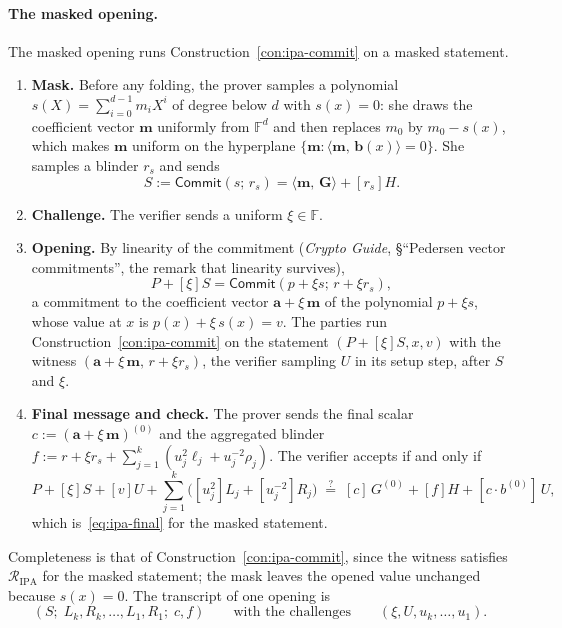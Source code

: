 \documentclass[11pt,a4paper]{article}
\theoremstyle{definition}
\newcommand{\F}{\mathbb{F}}
\newcommand{\ip}[2]{\langle #1,\, #2 \rangle}
\newcommand{\Comm}{\mathsf{Commit}}
\newcommand{\Rel}{\mathcal{R}}
\begin{document}
\paragraph{The masked opening.}
The masked opening runs Construction~\ref{con:ipa-commit} on a masked
statement.
\begin{enumerate}[leftmargin=*, itemsep=2pt]
\item \textbf{Mask.} Before any folding, the prover samples a
  polynomial $s(X) = \sum_{i=0}^{d-1} m_i X^{i}$ of degree below $d$
  with $s(x) = 0$: she draws the coefficient vector $\mathbf m$
  uniformly from $\F^{d}$ and then replaces $m_0$ by $m_0 - s(x)$,
  which makes $\mathbf m$ uniform on the hyperplane
  $\{\mathbf m : \ip{\mathbf m}{\mathbf b(x)} = 0\}$. She samples a
  blinder $r_s$ and sends
  \[
  S := \Comm(s;\, r_s) = \ip{\mathbf m}{\mathbf G} + [r_s]H .
  \]
\item \textbf{Challenge.} The verifier sends a uniform $\xi \in \F$.
\item \textbf{Opening.} By linearity of the commitment (\emph{Crypto
  Guide}, \S``Pedersen vector commitments'', the remark that linearity
  survives),
  \begin{equation}\label{eq:ipa-sym-masked}
  P + [\xi]S = \Comm(p + \xi s;\, r + \xi r_s),
  \end{equation}
  a commitment to the coefficient vector $\mathbf a + \xi\,\mathbf m$ of
  the polynomial $p + \xi s$, whose value at $x$ is
  $p(x) + \xi\,s(x) = v$. The parties run
  Construction~\ref{con:ipa-commit} on the statement
  $(P + [\xi]S, x, v)$ with the witness
  $(\mathbf a + \xi\,\mathbf m,\, r + \xi r_s)$, the verifier sampling
  $U$ in its setup step, after $S$ and $\xi$.
\item \textbf{Final message and check.} The prover sends the final
  scalar $c := (\mathbf a + \xi\,\mathbf m)^{(0)}$ and the aggregated
  blinder $f := r + \xi r_s + \sum_{j=1}^{k}(u_j^{2}\ell_j
  + u_j^{-2}\rho_j)$. The verifier accepts if and only if
  \begin{equation}\label{eq:ipa-masked-final}
  P + [\xi]S + [v]U + \sum_{j=1}^{k}\bigl([u_j^{2}]L_j + [u_j^{-2}]R_j\bigr)
  \;\overset{?}{=}\;
  [c]\,G^{(0)} + [f]H + [c \cdot b^{(0)}]\,U ,
  \end{equation}
  which is~\eqref{eq:ipa-final} for the masked statement.
\end{enumerate}
Completeness is that of Construction~\ref{con:ipa-commit}, since the
witness satisfies $\Rel_{\mathrm{IPA}}$ for the masked statement; the
mask leaves the opened value unchanged because $s(x) = 0$. The
transcript of one opening is
\[
(S;\; L_k, R_k, \dots, L_1, R_1;\; c, f)
\qquad\text{with the challenges}\qquad
(\xi, U, u_k, \dots, u_1).
\]
\end{document}
